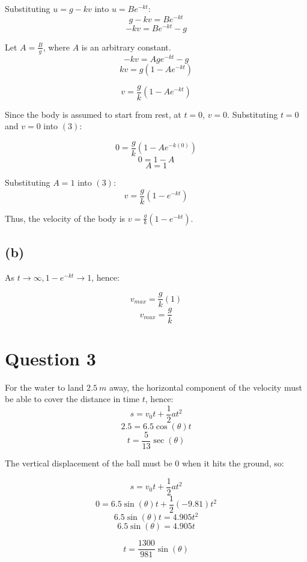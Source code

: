 \documentclass[11pt]{article}
\begin{document}
Substituting \(u = g - kv\) into \(u = Be^{-kt}\):
\[g - kv = Be^{-kt}\]
\[- kv = Be^{-kt} - g\]

Let \(A = \frac{B}{g}\), where \(A\) is an arbitrary constant.
\[- kv = Age^{-kt} - g\]
\[kv = g(1 - Ae^{-kt})\]

\begin{equation}
v = \frac{g}{k}(1 - Ae^{-kt}) \tag{3}
\end{equation}

\newpage

Since the body is assumed to start from rest, at \(t = 0\), \(v = 0\). Substituting \(t = 0\) and \(v = 0\) into \((3)\):

\[0 = \frac{g}{k}(1 - Ae^{-k(0)})\]
\[0 = 1 - A\]
\[A = 1\]

Substituting \(A = 1\) into \((3)\):
\[v = \frac{g}{k}(1 - e^{-kt})\]

Thus, the velocity of the body is \(v = \frac{g}{k}(1 - e^{-kt})\).

\subsection{(b)}
\label{sec:org083eb07}

As \(t \rightarrow \infty, 1 - e^{-kt} \rightarrow 1\), hence:

\[v_{max} = \frac{g}{k}(1)\]
\[v_{max} = \frac{g}{k}\]


\section{Question 3}
\label{sec:org9d91cd0}

For the water to land \(\qty{2.5}{m}\) away, the horizontal component of the velocity must be able to cover the distance in time \(t\), hence:
\[s = v_0t + \frac{1}{2}at^2\]
\[2.5 = 6.5\cos(\theta)t\]
\begin{equation}
t = \frac{5}{13}\sec(\theta) \tag{1}
\end{equation}

\newpage

The vertical displacement of the ball must be 0 when it hits the ground, so:

\[s = v_0t + \frac{1}{2}at^2\]
\[0 = 6.5\sin(\theta)t + \frac{1}{2}(-9.81)t^2\]
\[6.5\sin(\theta)t = 4.905t^2\]
\[6.5\sin(\theta) = 4.905t\]

\begin{equation}
t = \frac{1300}{981}\sin(\theta) \tag{2}
\end{equation}
\end{document}
